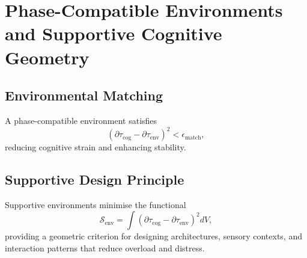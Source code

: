 \chapter{Phase-Compatible Environments and Supportive Cognitive Geometry}

\section{Environmental Matching}
A phase-compatible environment satisfies
\[
(\partial\tau_{\mathrm{cog}} - \partial\tau_{\mathrm{env}})^2 < \epsilon_{\mathrm{match}},
\]
reducing cognitive strain and enhancing stability.

\section{Supportive Design Principle}
Supportive environments minimise the functional
\[
\mathcal{S}_{\mathrm{env}} = \int (\partial\tau_{\mathrm{cog}} - \partial\tau_{\mathrm{env}})^2 dV,
\]
providing a geometric criterion for designing architectures, sensory contexts, and interaction patterns that reduce overload and distress.

